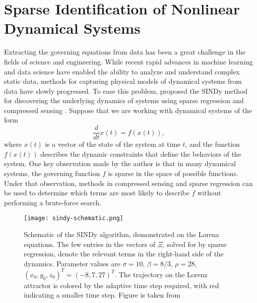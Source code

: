 \section{Sparse Identification of Nonlinear Dynamical Systems}

Extracting the governing equations from data has been a great challenge in the fields of science and engineering.
While recent rapid advances in machine learning and data science have enabled the ability to analyze and understand complex static data, methods for capturing physical models of dynamical systems from data have slowly progressed.
To ease this problem, \citeauthor{bruntonDiscoveringGoverningEquations2016} proposed the \gls{SINDy} method for discovering the underlying dynamics of systems using sparse regression and compressed sensing \cite{bruntonDiscoveringGoverningEquations2016}.
Suppose that we are working with dynamical systems of the form
\begin{equation*}
    \frac{d}{dt} x(t) = f(x(t)),
\end{equation*}
where $x(t)$ is a vector of the state of the system at time $t$, and the function $f(x(t))$ describes the dynamic constraints that define the behaviors of the system.
One key observation made by the author is that in many dynamical systems, the governing function $f$ is sparse in the space of possible functions.
Under that observation, methods in compressed sensing and sparse regression can be used to determine which terms are most likely to describe $f$ without performing a brute-force search.

\begin{figure}[h]
    \centering
    \texttt{[image: sindy-schematic.png]}
    \caption{Schematic of the SINDy algorithm, demonstrated on the Lorenz equations. The few entries in the vectors of $\Xi$, solved for by sparse regression, denote the relevant terms in the right-hand side of the dynamics. Parameter values are $\sigma = 10$, $\beta = 8/3$, $\rho = 28$, $(x_0 , y_0 , z_0)^T = (-8,7,27)^T$. The trajectory on the Lorenz attractor is colored by the adaptive time step required, with red indicating a smaller time step. Figure is taken from \citeauthor{bruntonDiscoveringGoverningEquations2016} \cite{bruntonDiscoveringGoverningEquations2016}}
    \label{fig:sindy-schematic}
\end{figure}

